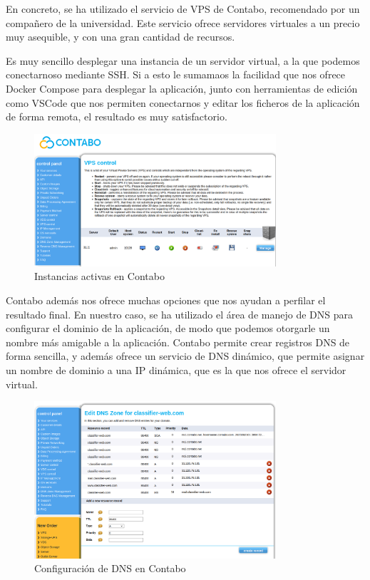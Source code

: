 En concreto, se ha utilizado el servicio de VPS de Contabo, recomendado por un compañero de la universidad.
Este servicio ofrece servidores virtuales a un precio muy asequible, y con una gran cantidad de recursos.

Es muy sencillo desplegar una instancia de un servidor virtual, a la que podemos conectarnoso mediante SSH.
Si a esto le sumamaos la facilidad que nos ofrece Docker Compose para desplegar la aplicación, junto con herramientas de edición como VSCode que nos permiten conectarnos y 
editar los ficheros de la aplicación de forma remota, el resultado es muy satisfactorio.

\begin{figure}[htpb]
    \centering
    \includegraphics[width=0.8\textwidth]{cap3/images/contabo-instance.png}
    \caption{Instancias activas en Contabo}
    \label{fig:contabo}
\end{figure}

Contabo además nos ofrece muchas opciones que nos ayudan a perfilar el resultado final.
En nuestro caso, se ha utilizado el área de manejo de DNS para configurar el dominio de la aplicación, de modo que podemos otorgarle un nombre más amigable a la aplicación.
Contabo permite crear registros DNS de forma sencilla, y además ofrece un servicio de DNS dinámico, que permite asignar un nombre de dominio a una IP dinámica, que es la que nos ofrece el servidor virtual.

\begin{figure}[htpb]
    \centering
    \includegraphics[width=0.8\textwidth]{cap3/images/contabo-dns.png}
    \caption{Configuración de DNS en Contabo}
    \label{fig:contabo-dns}
\end{figure}

